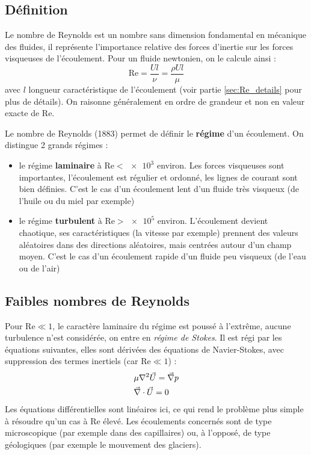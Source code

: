 
\subsection{Définition}
Le nombre de Reynolds est un nombre sans dimension fondamental en mécanique des fluides, il représente l'importance relative des forces d'inertie sur les forces visqueuses de l'écoulement. Pour un fluide newtonien, on le calcule ainsi :
%
\begin{equation}
    \mathrm{Re} = \frac{Ul}{\nu}
       = \frac{\rho U l}{\mu}
\end{equation}
%
avec $l$ longueur caractéristique de l'écoulement (voir partie \ref{sec:Re_details} pour plus de détails). On raisonne généralement en ordre de grandeur et non en valeur exacte de $\mathrm{Re}$.

Le nombre de Reynolds (1883) permet de définir le \textbf{régime} d'un écoulement. On distingue 2 grands régimes :
%
\begin{itemize}
    \item le régime \textbf{laminaire} à $\mathrm{Re} < \num{e3}$ environ. Les forces visqueuses sont importantes, l'écoulement est régulier et ordonné, les lignes de courant sont bien définies. C'est le cas d'un écoulement lent d'un fluide très visqueux (de l'huile ou du miel par exemple)
    \item le régime \textbf{turbulent} à $\mathrm{Re} > \num{e5}$ environ. L'écoulement devient chaotique, ses caractéristiques (la vitesse par exemple) prennent des valeurs aléatoires dans des directions aléatoires, mais centrées autour d'un champ moyen. C'est le cas d'un écoulement rapide d'un fluide peu visqueux (de l'eau ou de l'air)
\end{itemize}


\subsection{Faibles nombres de Reynolds}
Pour $\mathrm{Re} \ll 1$, le caractère laminaire du régime est poussé à l'extrême, aucune turbulence n'est considérée, on entre en \textit{régime de Stokes}. Il est régi par les équations suivantes, elles sont dérivées des équations de Navier-Stokes, avec suppression des termes inertiels (car $\mathrm{Re} \ll 1$) :
%
\begin{align}[left=\empheqlbrace]
    & \mu \nabla^2 \vec{U} = \vec{\nabla} p\\
    \notag & \vec{\nabla} \cdot \vec{U} = 0
\end{align}
%
Les équations différentielles sont linéaires ici, ce qui rend le problème plus simple à résoudre qu'un cas à $\mathrm{Re}$ élevé. Les écoulements concernés sont de type microscopique (par exemple dans des capillaires) ou, à l'opposé, de type géologiques (par exemple le mouvement des glaciers).


